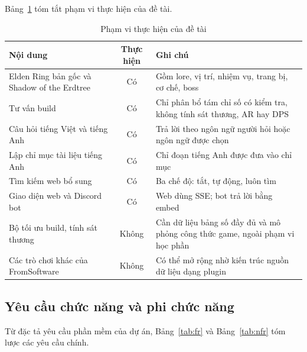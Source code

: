 Bảng~\ref{tab:scope} tóm tắt phạm vi thực hiện của đề tài.

\begin{table}[H]
    \centering
    \caption{Phạm vi thực hiện của đề tài}
    \label{tab:scope}
    \small
    \begin{tabularx}{\textwidth}{|>{\raggedright\arraybackslash}p{4.0cm}|c|>{\raggedright\arraybackslash}X|}
        \toprule
        \textbf{Nội dung} & \textbf{Thực hiện} & \textbf{Ghi chú} \\
        \midrule
        Elden Ring bản gốc và Shadow of the Erdtree & Có & Gồm lore, vị trí, nhiệm vụ, trang bị, cơ chế, boss \\ \hline
        Tư vấn build & Có & Chỉ phân bổ tám chỉ số có kiểm tra, không tính sát thương, AR hay DPS \\ \hline
        Câu hỏi tiếng Việt và tiếng Anh & Có & Trả lời theo ngôn ngữ người hỏi hoặc ngôn ngữ được chọn \\ \hline
        Lập chỉ mục tài liệu tiếng Anh & Có & Chỉ đoạn tiếng Anh được đưa vào chỉ mục \\ \hline
        Tìm kiếm web bổ sung & Có & Ba chế độ: tắt, tự động, luôn tìm \\ \hline
        Giao diện web và Discord bot & Có & Web dùng SSE; bot trả lời bằng embed \\ \hline
        Bộ tối ưu build, tính sát thương & Không & Cần dữ liệu bảng số đầy đủ và mô phỏng công thức game, ngoài phạm vi học phần \\ \hline
        Các trò chơi khác của FromSoftware & Không & Có thể mở rộng nhờ kiến trúc nguồn dữ liệu dạng plugin \\
        \bottomrule
    \end{tabularx}
\end{table}

\subsection{Yêu cầu chức năng và phi chức năng}
\label{sec:requirements}

Từ đặc tả yêu cầu phần mềm của dự án, Bảng~\ref{tab:fr} và Bảng~\ref{tab:nfr} tóm lược các yêu cầu chính.


